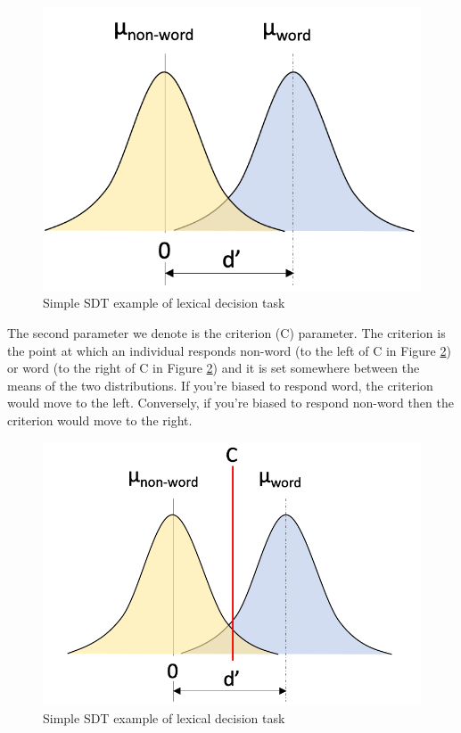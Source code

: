 \documentclass[]{book}
\begin{document}
\begin{figure}
\includegraphics[width=1\linewidth]{SDT_1} \caption{Simple SDT example of lexical decision task}\label{fig:SDT1}
\end{figure}

The second parameter we denote is the criterion (C) parameter. The criterion is the point at which an individual responds non-word (to the left of C in Figure \ref{fig:SDT2}) or word (to the right of C in Figure \ref{fig:SDT2}) and it is set somewhere between the means of the two distributions. If you're biased to respond word, the criterion would move to the left. Conversely, if you're biased to respond non-word then the criterion would move to the right.

\begin{figure}
\includegraphics[width=1\linewidth]{SDT_2} \caption{Simple SDT example of lexical decision task}\label{fig:SDT2}
\end{figure}
\end{document}

